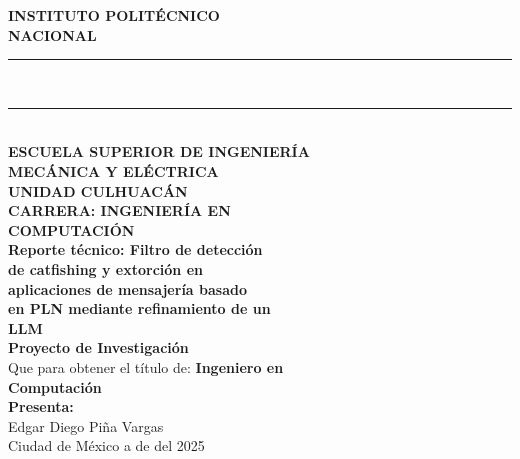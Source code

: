 \documentclass{article}
\begin{document}
\hspace*{3.5cm}
\parbox{12cm}{
    \begin{center}
    
    \vspace*{0.8cm}
    
    {\LARGE \textbf{INSTITUTO POLITÉCNICO}}\\[0.2cm]
    {\LARGE \textbf{NACIONAL}}\\[0.3cm]
    
    \rule{10cm}{0.5pt}\\[0.1cm]
    \rule{10cm}{0.5pt}\\[0.6cm]
    
    {\normalsize \textbf{ESCUELA SUPERIOR DE INGENIERÍA}}\\[0.1cm]
    {\normalsize \textbf{MECÁNICA Y ELÉCTRICA}}\\[0.1cm]
    {\normalsize \textbf{UNIDAD CULHUACÁN}}\\[0.8cm]
    
    {\small \textbf{CARRERA: INGENIERÍA EN}}\\[0.1cm]
    {\small \textbf{COMPUTACIÓN}}\\[1cm]
    
    {\large \textbf{Reporte técnico: Filtro de detección}}\\[0.15cm]
    {\large \textbf{de catfishing y extorción en}}\\[0.15cm]
    {\large \textbf{aplicaciones de mensajería basado}}\\[0.15cm]
    {\large \textbf{en PLN mediante refinamiento de un}}\\[0.15cm]
    {\large \textbf{LLM}}\\[1cm]
    
    {\normalsize \textbf{Proyecto de Investigación}}\\[1cm]
    
    {\small Que para obtener el título de: \textbf{Ingeniero en}}\\[0.1cm]
    {\small \textbf{Computación}}\\[0.8cm]
    
    {\small \textbf{Presenta:}}\\[0.2cm]
    {\small Edgar Diego Piña Vargas}\\[1cm]
    

    {\small Ciudad de México a \underline{\hspace{1cm}} de \underline{\hspace{2cm}} del 2025}
    
    \end{center}
}
\end{document}
